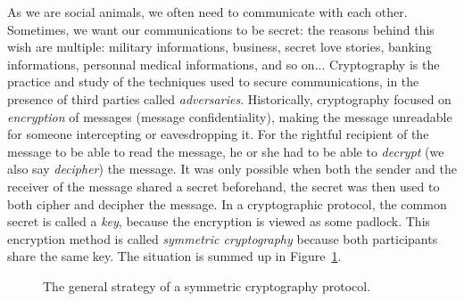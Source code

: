 As we are social animals, we often need to communicate with each other.
Sometimes, we want our communications to be secret: the reasons behind this
wish are multiple: military informations, business, secret love stories, banking
informations, personnal medical informations, and so on... Cryptography is the
practice and study of the techniques used to secure communications, in the
presence of third parties called \emph{adversaries}. Historically, cryptography
focused on \emph{encryption} of messages (message confidentiality), \ie making
the message unreadable for someone intercepting or eavesdropping it. For the
rightful recipient of the message to be able to read the message, he or she had
to be able to \emph{decrypt} (we also say \emph{decipher}) the message. It was
only possible when both the sender and the receiver of the message shared a
secret beforehand, the secret was then used to both cipher and decipher the
message. In a cryptographic protocol, the common secret is called a
\emph{key}, because the encryption is viewed as some padlock. This encryption
method is called \emph{symmetric cryptography} because both participants share
the same key. The situation is summed up in Figure~\ref{fig:crypto-sym}.
\begin{figure}[h]
  \centering
  \caption{The general strategy of a symmetric cryptography protocol.}
  \label{fig:crypto-sym}
\end{figure}
